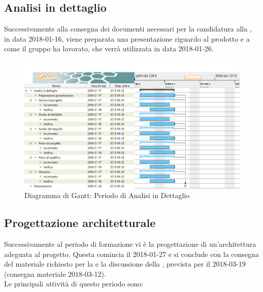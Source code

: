 	\newpage 	
	
	\subsection{Analisi in dettaglio}
	\label{pianificazioneAnalisiDettaglio}
		Successivamente alla consegna dei documenti necessari per la candidatura alla
		\RR{}, in data 2018-01-16, viene preparata una presentazione riguardo al prodotto \ProjectName{} e a come il
		gruppo ha lavorato, che verrà utilizzata in data 2018-01-26.
	
            \begin{figure}[H]
                \centering
                \includegraphics[width=1\linewidth]{./img/Gantt/AnalisiInDettaglio.png}
                \caption[Gantt - Analisi in dettaglio]{Diagramma di Gantt: Periodo di Analisi in Dettaglio}
            \end{figure}
	
	\newpage
	
	\subsection{Progettazione architetturale}
	\label{pianificazioneProgettazione}
		Successivamente al periodo di formazione vi è la progettazione di un'architettura
		adeguata al progetto. Questa comincia il 2018-01-27 e si conclude con la consegna del materiale 
		richiesto per la \RP{} e la discussione della \TecnologyBaseline{}, prevista per 
		il 2018-03-19 (consegna materiale 2018-03-12).\\
		Le principali attività di questo periodo sono:

